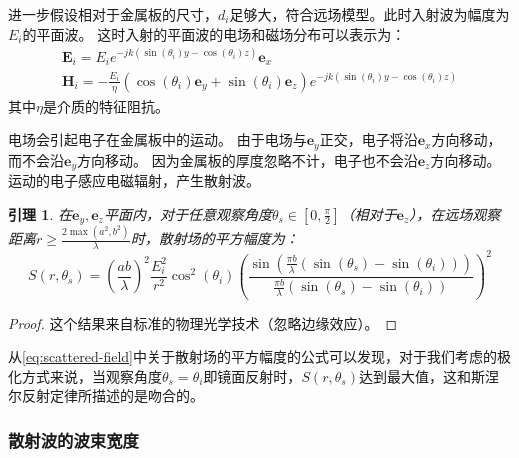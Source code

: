 \documentclass[supercite]{HustGraduPaper}
\newtheorem{lemma}{\indent 引理}[section]
\begin{document}
进一步假设相对于金属板的尺寸，$d_i$足够大，符合远场模型。此时入射波为幅度为$E_i$的平面波。
这时入射的平面波的电场和磁场分布可以表示为：
\begin{equation}
	\begin{array}{l}
		\mathbf{E}_{i}=E_{i} e^{-j k\left(\sin \left(\theta_{i}\right) y-\cos \left(\theta_{i}\right) z\right)} \boldsymbol{e}_{x} \\
		\mathbf{H}_{i}=-\frac{E_{i}}{\eta}\left(\cos \left(\theta_{i}\right) \boldsymbol{e}_{y}+\sin \left(\theta_{i}\right) \boldsymbol{e}_{z}\right) e^{-j k\left(\sin \left(\theta_{i}\right) y-\cos \left(\theta_{i}\right) z\right)}
	\end{array}
	\label{eq:e-field}
\end{equation}
其中$\eta$是介质的特征阻抗。

电场会引起电子在金属板中的运动。
由于电场与$\boldsymbol{e}_{y}$正交，电子将沿$\boldsymbol{e}_{x}$方向移动，而不会沿$\boldsymbol{e}_{y}$方向移动。
因为金属板的厚度忽略不计，电子也不会沿$\boldsymbol{e}_{z}$方向移动。
运动的电子感应电磁辐射，产生散射波。

\begin{lemma}
	\label{lemma:scattered-field}
	在$\boldsymbol{e}_{y}, \boldsymbol{e}_{z}$平面内，对于任意观察角度$\theta_{s} \in\left[0, \frac{\pi}{2}\right]$（相对于$\boldsymbol{e}_{z}$），在远场观察距离$r \geq \frac{2 \max \left(a^{2}, b^{2}\right)}{\lambda}$时，散射场的平方幅度为：
	\begin{equation}
		S\left(r, \theta_{s}\right)=\left(\frac{a b}{\lambda}\right)^{2} \frac{E_{i}^{2}}{r^{2}} \cos ^{2}\left(\theta_{i}\right)\left(\frac{\sin \left(\frac{\pi b}{\lambda}\left(\sin \left(\theta_{s}\right)-\sin \left(\theta_{i}\right)\right)\right)}{\frac{\pi b}{\lambda}\left(\sin \left(\theta_{s}\right)-\sin \left(\theta_{i}\right)\right)}\right)^{2}
		\label{eq:scattered-field}
	\end{equation}
\end{lemma}

\begin{proof}
	这个结果来自标准的物理光学技术（忽略边缘效应）\cite{balanis2012advanced}。
\end{proof}

从\autoref{eq:scattered-field}中关于散射场的平方幅度的公式可以发现，对于我们考虑的极化方式来说，当观察角度$\theta_{s}=\theta_{i}$即镜面反射时，$S\left(r, \theta_{s}\right)$达到最大值，这和斯涅尔反射定律所描述的是吻合的。

\subsubsection{散射波的波束宽度}
\end{document}
